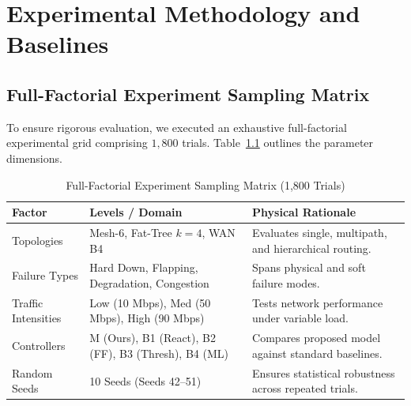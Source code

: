 \documentclass[11pt,a4paper]{report}
\begin{document}
\chapter{Experimental Methodology and Baselines}

\section{Full-Factorial Experiment Sampling Matrix}
To ensure rigorous evaluation, we executed an exhaustive full-factorial experimental grid comprising $1{,}800$ trials. Table~\ref{tab:exp_matrix} outlines the parameter dimensions.

\begin{table}[htbp]
\centering
\caption{Full-Factorial Experiment Sampling Matrix (1,800 Trials)}
\label{tab:exp_matrix}
\small
\setlength{\tabcolsep}{4.5pt}
\begin{tabularx}{\linewidth}{@{} p{3.0cm} p{5.0cm} >{\raggedright\arraybackslash}X @{}}
\toprule
\textbf{Factor} & \textbf{Levels / Domain} & \textbf{Physical Rationale} \\
\midrule
Topologies          & Mesh-6, Fat-Tree $k=4$, WAN B4 & Evaluates single, multipath, and hierarchical routing. \\
Failure Types       & Hard Down, Flapping, Degradation, Congestion & Spans physical and soft failure modes. \\
Traffic Intensities & Low (10 Mbps), Med (50 Mbps), High (90 Mbps)  & Tests network performance under variable load. \\
Controllers         & M (Ours), B1 (React), B2 (FF), B3 (Thresh), B4 (ML) & Compares proposed model against standard baselines. \\
Random Seeds        & 10 Seeds (Seeds 42--51)         & Ensures statistical robustness across repeated trials. \\
\bottomrule
\end{tabularx}
\end{table}
\end{document}
